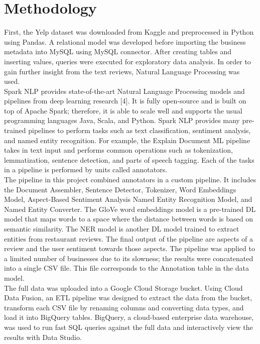 \documentclass[11pt,journal,compsoc]{IEEEtran}
\begin{document}
\section{Methodology}
First, the Yelp dataset was downloaded from Kaggle and preprocessed in Python using Pandas. A relational model was developed before importing the business metadata into MySQL using MySQL connector. After creating tables and inserting values, queries were executed for exploratory data analysis. In order to gain further insight from the text reviews, Natural Language Processing was used. \\
\indent Spark NLP provides state-of-the-art Natural Language Processing models and pipelines from deep learning research [4]. It is fully open-source and is built on top of Apache Spark; therefore, it is able to scale well and supports the usual programming languages Java, Scala, and Python. Spark NLP provides many pre-trained pipelines to perform tasks such as text classification, sentiment analysis, and named entity recognition. For example, the Explain Document ML pipeline takes in text input and performs common operations such as tokenization, lemmatization, sentence detection, and parts of speech tagging. Each of the tasks in a pipeline is performed by units called annotators.  \\
\indent The pipeline in this project combined annotators in a custom pipeline. It includes the Document Assembler, Sentence Detector, Tokenizer, Word Embeddings Model, Aspect-Based Sentiment Analysis Named Entity Recognition Model, and Named Entity Converter. The GloVe word embeddings model is a pre-trained DL model that maps words to a space where the distance between words is based on semantic similarity. The NER model is another DL model trained to extract entities from restaurant reviews. The final output of the pipeline are aspects of a review and the user sentiment towards those aspects. The pipeline was applied to a limited number of businesses due to its slowness; the results were concatenated into a single CSV file. This file corresponds to the Annotation table in the data model. \\
\indent The full data was uploaded into a Google Cloud Storage bucket. Using Cloud Data Fusion, an ETL pipeline was designed to extract the data from the bucket, transform each CSV file by renaming columns and converting data types, and load it into BigQuery tables. BigQuery, a cloud-based enterprise data warehouse, was used to run fast SQL queries against the full data and interactively view the results with Data Studio. 
\end{document}
